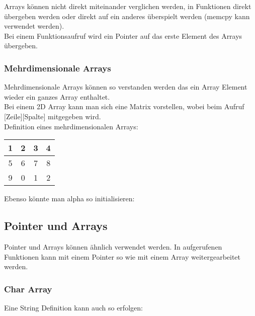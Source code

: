 Arrays können nicht direkt miteinander verglichen werden, in Funktionen direkt übergeben werden oder direkt auf ein anderes überspielt werden (memcpy kann verwendet werden).\\
Bei einem Funktionsaufruf wird ein Pointer auf das erste Element des Arrays übergeben.

\subsubsection{Mehrdimensionale Arrays}

Mehrdimensionale Arrays können so verstanden werden das ein Array Element wieder ein ganzes Array enthaltet.\\
Bei einem 2D Array kann man sich eine Matrix vorstellen, wobei beim Aufruf [Zeile][Spalte] mitgegeben wird.\\
Definition eines mehrdimensionalen Arrays:\\
\noindent
\begin{minipage}{0.5\columnwidth}

\end{minipage}
\begin{minipage}{0.5\columnwidth}
\begin{tabular}{|c|c|c|c|}
\hline
1 & 2 & 3 & 4 \\ \hline
5 & 6 & 7 & 8 \\ \hline
9 & 0 & 1 & 2 \\ \hline
\end{tabular}
\end{minipage}

Ebenso könnte man alpha so initialisieren:



\subsection{Pointer und Arrays}

Pointer und Arrays können ähnlich verwendet werden. 
In aufgerufenen Funktionen kann mit einem Pointer so wie mit einem Array weitergearbeitet werden. 



\subsubsection{Char Array}

Eine String Definition kann auch so erfolgen:

